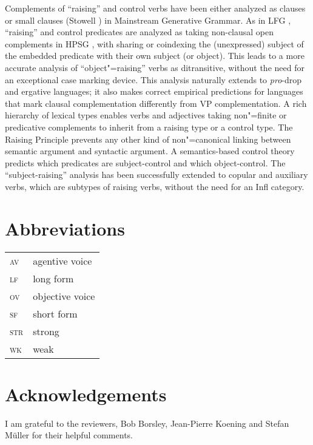 Complements of ``raising'' and control verbs have been either analyzed as clauses \citep{Chomsky81a}\addpages
or small clauses (Stowell \citeyear{Stowell81a-u,Stowell1983}\addpages) in Mainstream Generative Grammar.  As in LFG
\citep{Bresnan1982}, ``raising'' and control predicates are analyzed as taking non-clausal open
complements in HPSG \citep[Chapter~3]{PollardandSag1994}, with sharing or coindexing the (unexpressed) subject
of the embedded predicate with their own subject (or object). This leads to a more accurate analysis
of ``object"=raising'' verbs as ditransitive, without the need for an exceptional case marking
device. This analysis naturally extends to \emph{pro}-drop and ergative languages; it also makes correct
empirical predictions for languages that mark clausal complementation differently from VP
complementation. A rich hierarchy of lexical types enables verbs and adjectives taking non"=finite
or predicative complements to inherit from a raising type or a control type. The Raising Principle
prevents any other kind of non"=canonical linking between semantic argument and syntactic
argument. A semantics-based control theory predicts which predicates are subject-control and which
object-control. The ``subject-raising'' analysis has been successfully extended to copular and
auxiliary verbs, which are subtypes of raising verbs, without the need for an Infl category.



\section*{Abbreviations}

\begin{tabularx}{.45\textwidth}{@{}lX}
\textsc{av} & agentive voice\\
\textsc{lf} & long form\\ 
\textsc{ov} & objective voice\\
\textsc{sf} & short form\\
\textsc{str} & strong\\
\textsc{wk} & weak\\

\end{tabularx}

\section*{Acknowledgements}

I am grateful to the reviewers, Bob Borsley, Jean-Pierre Koening and Stefan Müller for their helpful comments.
{\sloppy
\printbibliography[heading=subbibliography,notkeyword=this] 
}




